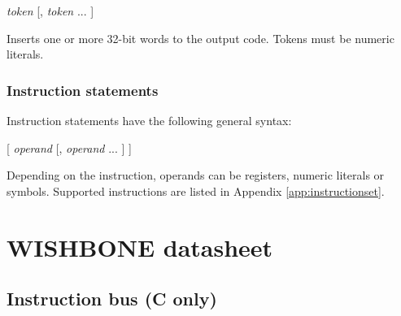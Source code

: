 \documentclass[a4paper,12pt,twoside,extrafontsizes]{memoir}
\begin{document}
\begin{codepar}
 \emph{token} [, \emph{token} ... ]
\end{codepar}

Inserts one or more 32-bit words to the output code. Tokens must be numeric literals.

\subsection{Instruction statements}

Instruction statements have the following general syntax:

\begin{codepar}
     [ \emph{operand} [, \emph{operand} ... ] ]
\end{codepar}

Depending on the instruction, operands can be registers, numeric literals or symbols. Supported instructions are listed in Appendix \ref{app:instructionset}.

\chapter{WISHBONE datasheet}
\label{app:wishbonedatasheet}

\section[Instruction bus (LXP32C only)]{Instruction bus (\lxp{}C only)}
\end{document}
